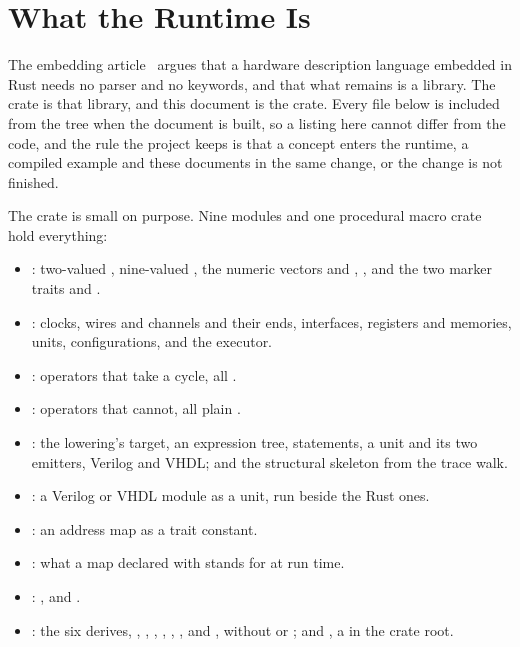 \section{What the Runtime Is}
\label{sec:r-overview}

The embedding article~\cite{embedding} argues that a hardware
description language embedded in Rust needs no parser and no keywords,
and that what remains is a library. The crate  is that
library, and this document is the crate. Every file below is included
from the tree when the document is built, so a listing here cannot
differ from the code, and the rule the project keeps is that a concept
enters the runtime, a compiled example and these documents in the same
change, or the change is not finished.

The crate is small on purpose. Nine modules and one procedural macro
crate hold everything:

\begin{itemize}
\item {}: two-valued , nine-valued
  , the numeric vectors  and ,
  , and the two marker traits 
  and .
\item {}: clocks, wires and channels and their ends,
  interfaces, registers and memories, units, configurations,
  and the executor.
\item {}: operators that take a cycle, all
  .
\item {}: operators that cannot, all plain .
\item {}: the lowering's target, an expression
  tree, statements, a  unit and its two emitters,
  Verilog and VHDL; and the structural skeleton from the trace walk.
\item {}: a Verilog or VHDL module as a unit, run
  beside the Rust ones.
\item {}: an address map as a trait constant.
\item {}: what a map declared with 
  stands for at run time.
\item {}: ,  and
  .
\item {}: the six derives, ,
  , , , ,
  , \code{\#[pipeline]} and \code{\#[lower]}, without  or ; and
  , a  in the crate root.
\end{itemize}

